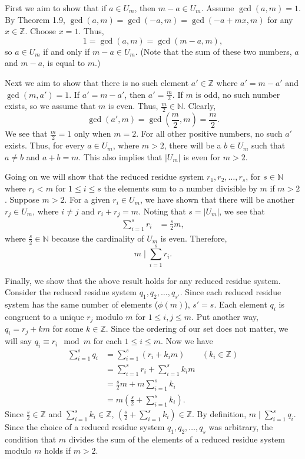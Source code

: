 \documentclass[12 pt]{amsart}
\begin{document}
  First we aim to show that if $a \in U_m$, then $m-a \in U_m$.
  Assume $\gcd(a, m) = 1$. 
  By Theorem 1.9, $\gcd(a, m) = \gcd(-a, m) = \gcd(-a + mx, m )$ for any 
  $x \in \mathbb{Z}$. 
  Choose $x = 1$. 
  Thus, 
  \[
    1 = \gcd(a, m) = \gcd(m-a, m), 
  \]
  so $a \in U_m$ if and only if $m-a \in U_m$.
  (Note that the sum of these two numbers, $a$ and 
  $m -a$, is equal to $m$.)

  Next we aim to show that there is no such element
  $a' \in \mathbb{Z}$ where $a' = m - a'$ and 
  $\gcd(m, a') = 1$.
  If $a' = m - a'$, then $a' = \frac{m}{2}$.
  If $m$ is odd, no such number exists, so we 
  assume that $m$ is even. 
  Thus, $\frac{m}{2} \in \mathbb{N}$.
  Clearly,
  \[
    \gcd(a', m) 
    = \gcd \left( \frac{m}{2}, m \right) 
    = \frac{m}{2}.
  \]
  We see that $\frac{m}{2} = 1$ only when $m = 2$.
  For all other positive numbers, no such $a'$ exists.
  Thus, for every $a \in U_m$, where $m > 2$, there will be a 
  $b\in U_m$ such that $a \neq b$ and $a + b = m$.
  This also implies that $|U_m|$ is even for $m > 2$.

  Going on we will show that the reduced residue system
  $r_1, r_2, \ldots, r_s$, for $s \in \mathbb{N}$ where
  $r_i < m$ for $1 \leq i \leq s$ the elements sum 
  to a number divisible by $m$ if $m > 2$.
  Suppose $m > 2$.
  For a given $r_i \in U_m$, we have shown that there will
  be another $r_j \in U_m$, where $i \neq j$ and 
  $r_i + r_j = m$.
  Noting that $s = |U_m|$, we see that
  \begin{align*}
    \sum_{i=1}^s r_i &= \frac{s}{2} m,
  \end{align*} 
  where $\frac{s}{2} \in \mathbb{N}$ because the cardinality
  of $U_m$ is even.
  Therefore, 
  \[
    m \mid \sum_{i=1}^s r_i.
  \]

  Finally, we show that the above result
  holds for any reduced residue system.
  Consider the reduced residue system
  $q_1, q_2, \ldots, q_{s'}$.
  Since each reduced residue system has 
  the same number of elements ($\phi(m)$), 
  $s' = s$. 
  Each element $q_i$ is congruent to a 
  unique
  $r_j$ modulo $m$ for $1 \leq i,j \leq m$.
  Put another way, $q_i = r_j + km$ for some
  $k \in \mathbb{Z}$.
  Since the ordering of our set does not matter,
  we will say $q_i \equiv r_i \mod m$ for each
  $1 \leq i \leq m$.
  Now we have
  \begin{align*}
    \sum_{i=1}^s q_i &= \sum_{i=1}^s (r_i + k_i m) & (k_i \in \mathbb{Z}) \\
                     &= \sum_{i=1}^s r_i + \sum_{i=1}^s k_i m  \\
                     &= \frac{s}{2} m + m \sum_{i=1}^s k_i  \\
                     &= m \left( \frac{s}{2}  +  \sum_{i=1}^s k_i \right).
  \end{align*}
  Since $\frac{s}{2} \in \mathbb{Z}$ and $\sum_{i=1}^s k_i \in \mathbb{Z}$, 
  $\left( \frac{s}{2}  +  \sum_{i=1}^s k_i \right)  \in \mathbb{Z}$.
  By definition, $m \mid \sum_{i=1}^s q_i$.
  Since the choice of a reduced residue system 
  $q_1, q_2, \ldots, q_s$ 
  was arbitrary, 
  the condition that $m$ divides the sum of the elements of a 
  reduced residue system modulo $m$ holds if $m > 2$. 
\end{document}
